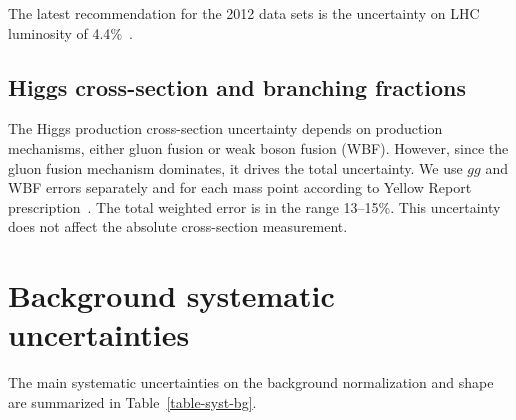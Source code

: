 The latest recommendation for the 2012 data sets is the uncertainty on LHC luminosity of 4.4$\%$~\cite{CMS-PAS-LUM-12-001}.

\subsection*{Higgs cross-section and branching fractions}

The Higgs production cross-section uncertainty depends on production mechanisms, either gluon fusion or weak boson fusion (WBF). However, since the gluon fusion mechanism dominates, it drives the total uncertainty.  We use $gg$ and WBF errors separately and for each mass point according to Yellow Report prescription~\cite{LHCHiggsCrossSectionWorkingGroup:2012ti}. The total weighted error is in the range 13--15\%. This uncertainty does not affect the absolute cross-section measurement.

















\section{Background systematic uncertainties}

The main systematic uncertainties on the background normalization and shape are summarized in Table~\ref{table-syst-bg}.


